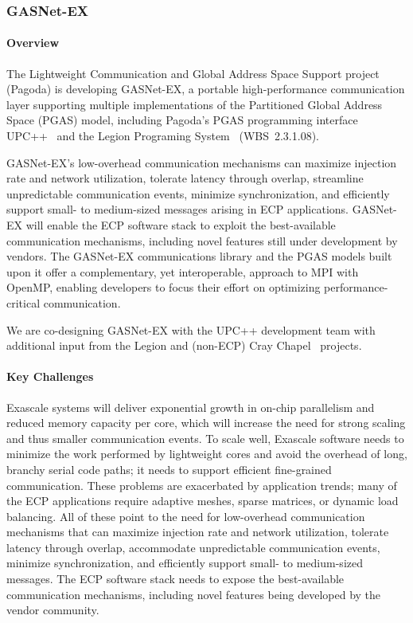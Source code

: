 \subsubsection{GASNet-EX}
\paragraph{Overview} 

The Lightweight Communication and Global Address Space Support project (Pagoda)
is developing GASNet-EX, a portable high-performance communication layer
supporting multiple implementations of the Partitioned Global Address Space
(PGAS) model, including Pagoda's PGAS programming interface UPC++~\cite{Bachan:paw17}
 and the Legion Programing
System~\cite{bauer2012legion,legion-site} (WBS~2.3.1.08).

GASNet-EX's low-overhead communication mechanisms can maximize
injection rate and network utilization, tolerate latency through
overlap, streamline unpredictable communication events, minimize
synchronization, and efficiently support small- to medium-sized
messages arising in ECP applications.  GASNet-EX will enable the ECP
software stack to exploit the best-available communication mechanisms,
including novel features still under development by vendors.  The
GASNet-EX communications library and the PGAS models built upon it
offer a complementary, yet interoperable, approach to MPI with OpenMP,
enabling developers to focus their effort on optimizing
performance-critical communication.

We are co-designing GASNet-EX with the UPC++ development team with
additional input from the Legion and
(non-ECP) Cray Chapel~\cite{chapel-chapter,chapel-site} projects.

\paragraph{Key  Challenges}

Exascale systems will deliver exponential growth in on-chip parallelism and
reduced memory capacity per core, which will increase the need for strong
scaling and thus smaller communication events.  To scale well, Exascale
software needs to minimize the work performed by lightweight cores and avoid the
overhead of long, branchy serial code paths; it needs to support efficient
fine-grained communication.
These problems are exacerbated by application trends; many of the ECP applications require
adaptive meshes, sparse matrices,
or dynamic load balancing.
All of these point to the need for low-overhead communication mechanisms that
can maximize injection rate and network utilization, tolerate latency through
overlap, accommodate unpredictable communication events, minimize synchronization,
and efficiently support small- to medium-sized messages. The ECP software stack
needs to expose the best-available communication mechanisms, including novel
features being developed by the vendor community.

